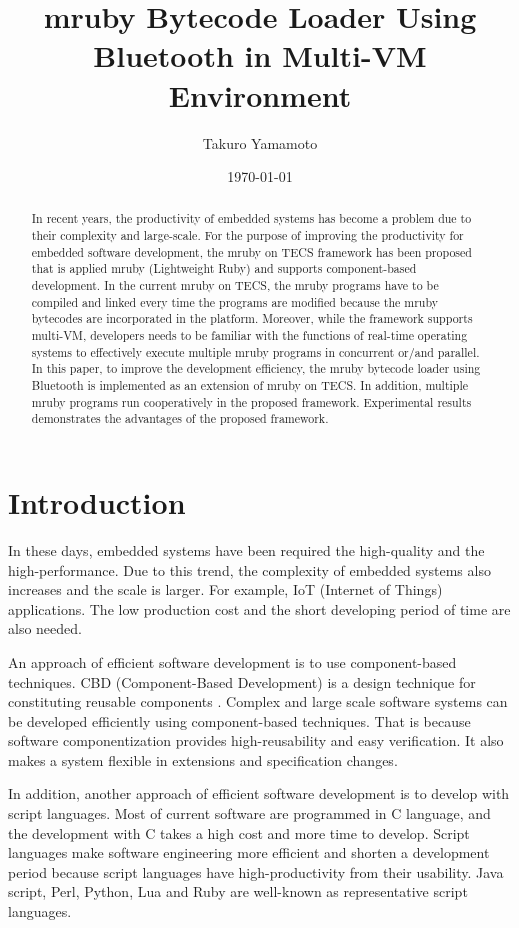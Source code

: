 \documentclass[conference,compsoc]{IEEEtran}
\title{mruby Bytecode Loader Using Bluetooth in Multi-VM Environment}
\author{Takuro Yamamoto}
\date{\today}
\begin{document}
\maketitle
\begin{abstract}
In recent years, the productivity of embedded systems has become a problem due to their complexity and large-scale.
For the purpose of improving the productivity for embedded software development, the mruby on TECS framework has been proposed that is applied mruby (Lightweight Ruby) and supports component-based development.
In the current mruby on TECS, the mruby programs have to be compiled and linked every time the programs are modified because the mruby bytecodes are incorporated in the platform.
Moreover, while the framework supports multi-VM, developers needs to be familiar with the functions of real-time operating systems to effectively execute multiple mruby programs in concurrent or/and parallel.
In this paper, to improve the development efficiency, the mruby bytecode loader using Bluetooth is implemented as an extension of mruby on TECS.
In addition, multiple mruby programs run cooperatively in the proposed framework.
Experimental results demonstrates the advantages of the proposed framework.
\end{abstract}
\section{Introduction}
In these days, embedded systems have been required the high-quality and the high-performance.
Due to this trend, the complexity of embedded systems also increases and the scale is larger.
For example, IoT (Internet of Things) applications.
The low production cost and the short developing period of time are also needed.

An approach of efficient software development is to use component-based techniques.
CBD (Component-Based Development) is a design technique for constituting reusable components \cite{Crnkovic:2005:CSE:1062455.1062631}.
Complex and large scale software systems can be developed efficiently using component-based techniques.
That is because software componentization provides high-reusability and easy verification.
It also makes a system flexible in extensions and specification changes.

In addition, another approach of efficient software development is to develop with script languages.
Most of current software are programmed in C language, and the development with C takes a high cost and more time to develop.
Script languages make software engineering more efficient and shorten a development period because script languages have high-productivity from their usability.
Java script, Perl, Python, Lua and Ruby are well-known as representative script languages.
\end{document}
